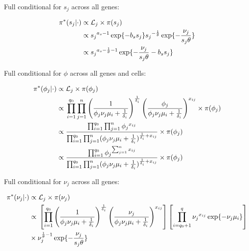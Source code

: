 \begin{Comment}
Full conditional for $s_j$ across all genes:
\begin{fleqn}
\begin{align*}
\pi^*(s_j|\cdot)&\propto{}\mathcal{L}_j\times\pi(s_j)\\
&\propto{}s_j{}^{a_s-1}\exp\lbrace-b_ss_j\rbrace{}s_j{}^{-\frac{1}{\theta}}\exp\lbrace-\frac{\nu_j}{s_j\theta}\rbrace\\
&\propto{}s_j{}^{a_s-\frac{1}{\theta}-1}\exp\lbrace-\frac{\nu_j}{s_j\theta}-b_ss_j\rbrace
\end{align*}
\end{fleqn}
\end{Comment}

\begin{Comment}
Full conditional for $\phi$ across all genes and cells:
\begin{fleqn}
\begin{align*}
\pi^*(\phi_j|\cdot)&\propto{}\mathcal{L}_j\times\pi(\phi_j)\\
&\propto{}\prod_{i=1}^{q_0}\prod_{j=1}^{n}\left(\frac{1}{\phi_j\nu_j\mu_i+\frac{1}{\delta_i}}\right)^\frac{1}{\delta_i}\left(\frac{\phi_j}{\phi_j\nu_j\mu_i+\frac{1}{\delta_i}}\right)^{x_{ij}}\times{}\pi(\phi_j)\\
&\propto{}\frac{\prod_{i=1}^{q_0}\prod_{j=1}^{n}\phi_j{}^{x_{ij}}}{\prod_{i=1}^{q_0}\prod_{j=1}^{n}(\phi_j\nu_j\mu_i+\frac{1}{\delta_i})^{\frac{1}{\delta_i}+x_{ij}}}\times{}\pi(\phi_j)\\
&\propto{}\frac{\prod_{i=1}^{q_0}\phi_j{}^{\sum_{j=1}^nx_{ij}}}{\prod_{i=1}^{q_0}\prod_{j=1}^{n}(\phi_j\nu_j\mu_i+\frac{1}{\delta_i})^{\frac{1}{\delta_i}+x_{ij}}}\times{}\pi(\phi_j)
\end{align*}
\end{fleqn}

Full conditional for $\nu_j$ across all genes:
\begin{fleqn}
\begin{align*}
\pi^*(\nu_j|\cdot)&\propto{}\mathcal{L}_j\times\pi(\nu_j)\\
&\propto{}\left[\prod_{i=1}^{q_0}\left(\frac{1}{\phi_j\nu_j\mu_i+\frac{1}{\delta_i}}\right)^\frac{1}{\delta_i}\left(\frac{\nu_j}{\phi_j\nu_j\mu_i+\frac{1}{\delta_i}}\right)^{x_{ij}}\right]\left[\prod_{i=q_0+1}^{q}\nu_j{}^{x_{ij}}\exp\lbrace-\nu_j\mu_i\rbrace\right]\\
&\times{}\nu_j^{\frac{1}{\theta}-1}\exp\lbrace-\frac{\nu_j}{s_j\theta}\rbrace
\end{align*}
\end{fleqn}


\end{Comment}
